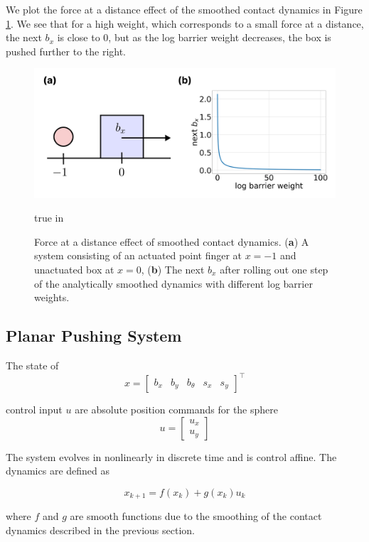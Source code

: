 \documentclass[journal]{IEEEtran}
\begin{document}
We plot the force at a distance effect of the smoothed contact dynamics in Figure \ref{fig:smoothed_contact_dynamics}. We see that for a high weight, which corresponds to a small force at a distance, the next $b_x$ is close to 0, but as the log barrier weight decreases, the box is pushed further to the right.

\begin{figure}[t]
	\centering\includegraphics[width = 0.45 \textwidth]
	{figures/smoothed_contact_dynamics.png}
    \caption{Force at a distance effect of smoothed contact dynamics. (\textbf{a}) A system consisting of an actuated point finger at $x=-1$ and unactuated box at $x=0$, (\textbf{b}) The next $b_x$ after rolling out one step of the analytically smoothed dynamics with different log barrier weights.}
	\label{fig:smoothed_contact_dynamics}
	 true in
\end{figure}

\subsection{Planar Pushing System}
The state of 
\begin{equation}
    x = \begin{bmatrix}b_x & b_y & b_{\theta}& s_x& s_y\end{bmatrix}^\top
\end{equation}

control input $u$ are absolute position commands for the sphere
\begin{equation}
    u = \begin{bmatrix}u_x\\ u_y \end{bmatrix}
\end{equation}

The system evolves in nonlinearly in discrete time and is control affine. The dynamics are defined as

\begin{equation}
    x_{k+1} = f(x_k) + g(x_k)u_k
\end{equation}

where $f$ and $g$ are smooth functions due to the smoothing of the contact dynamics described in the previous section.
\end{document}
